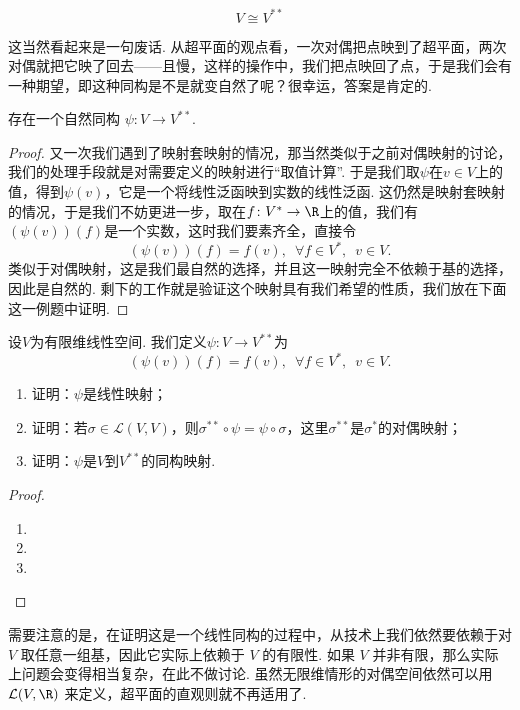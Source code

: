 \[
    V \cong V^{**}
\]

这当然看起来是一句废话. 从超平面的观点看，一次对偶把点映到了超平面，两次对偶就把它映了回去——且慢，这样的操作中，我们把点映回了点，于是我们会有一种期望，即这种同构是不是就变自然了呢？很幸运，答案是肯定的.

\begin{theorem}{}{}
    存在一个自然同构 $\psi: V \to V^{**}$.
\end{theorem}

\begin{proof}
    又一次我们遇到了映射套映射的情况，那当然类似于之前对偶映射的讨论，我们的处理手段就是对需要定义的映射进行``取值计算''. 于是我们取$\psi$在$v\in V$上的值，得到$\psi(v)$，它是一个将线性泛函映到实数的线性泛函. 这仍然是映射套映射的情况，于是我们不妨更进一步，取在$f\colon V^*\to\R$上的值，我们有$(\psi(v))(f)$是一个实数，这时我们要素齐全，直接令
    \[(\psi(v))(f) = f(v),\enspace\forall f\in V^*,\enspace v\in V.\]
    类似于对偶映射，这是我们最自然的选择，并且这一映射完全不依赖于基的选择，因此是自然的. 剩下的工作就是验证这个映射具有我们希望的性质，我们放在下面这一例题中证明.
\end{proof}

\begin{example}{}{}
    设$V$为有限维线性空间. 我们定义$\psi:V\to V^{**}$为
    \[(\psi(v))(f) = f(v),\enspace\forall f\in V^*,\enspace v\in V.\]
    \begin{enumerate}
        \item 证明：$\psi$是线性映射；

        \item 证明：若$\sigma\in\mathcal{L}(V,V)$，则$\sigma^{**}\circ\psi=\psi\circ\sigma$，这里$\sigma^{**}$是$\sigma^*$的对偶映射；

        \item 证明：$\psi$是$V$到$V^{**}$的同构映射.
    \end{enumerate}
\end{example}

\begin{proof}
    \begin{enumerate}
        \item
        \item
        \item
    \end{enumerate}
\end{proof}

需要注意的是，在证明这是一个线性同构的过程中，从技术上我们依然要依赖于对 $V$ 取任意一组基，因此它实际上依赖于 $V$ 的有限性. 如果 $V$ 并非有限，那么实际上问题会变得相当复杂，在此不做讨论. 虽然无限维情形的对偶空间依然可以用 $\mathcal{L}(V, \R)$ 来定义，超平面的直观则就不再适用了.

